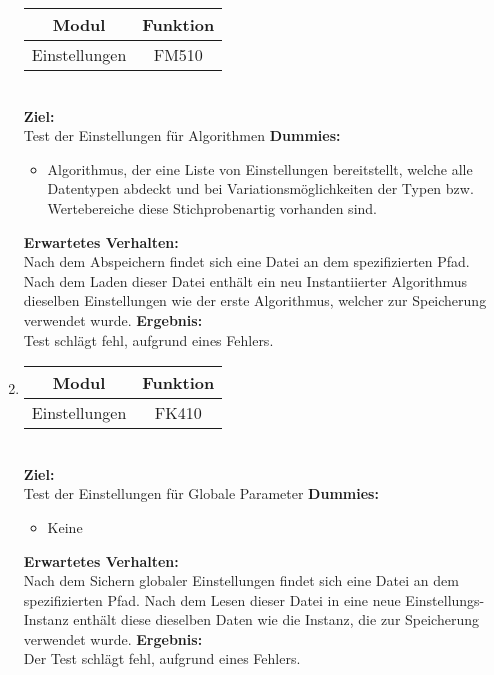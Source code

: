 \begin{enumerate}[align=left, leftmargin=4em, label={\textbf{\textbackslash T2.\arabic*\textbackslash}} ]
\begin{tabular}{|c|c|}
			\hline Modul & Funktion \\
			\hline Einstellungen & FM510 \\
			\hline
		\end{tabular}\\
		\subitem \textbf{Ziel:} \\ Test der Einstellungen für Algorithmen
		\subitem \textbf{Dummies:} \begin{itemize}
			\item Algorithmus, der eine Liste von Einstellungen bereitstellt, welche alle Datentypen abdeckt und bei Variationsmöglichkeiten der Typen bzw. Wertebereiche diese Stichprobenartig vorhanden sind.
		\end{itemize}
		\subitem \textbf{Erwartetes Verhalten:}\\
		Nach dem Abspeichern findet sich eine Datei an dem spezifizierten Pfad. Nach dem Laden dieser Datei enthält ein neu Instantiierter Algorithmus dieselben Einstellungen wie der erste Algorithmus, welcher zur Speicherung verwendet wurde.
		\subitem \textbf{Ergebnis:}\\
		Test schlägt fehl, aufgrund eines Fehlers.
		\\\item \begin{tabular}{|c|c|}
			\hline Modul & Funktion \\
			\hline Einstellungen & FK410 \\
			\hline
		\end{tabular}\\
		\subitem \textbf{Ziel:} \\ Test der Einstellungen für Globale Parameter
		\subitem \textbf{Dummies:} \begin{itemize}
			\item Keine
		\end{itemize}
		\subitem \textbf{Erwartetes Verhalten:}\\
		Nach dem Sichern globaler Einstellungen findet sich eine Datei an dem spezifizierten Pfad. Nach dem Lesen dieser Datei in eine neue Einstellungs-Instanz enthält diese dieselben Daten wie die Instanz, die zur Speicherung verwendet wurde.
		\subitem \textbf{Ergebnis:}\\
		Der Test schlägt fehl, aufgrund eines Fehlers.

\end{enumerate}
